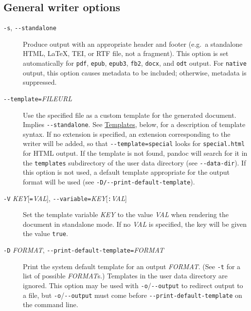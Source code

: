 \documentclass[]{article}
\begin{document}
\hypertarget{general-writer-options}{%
\subsection{General writer options}\label{general-writer-options}}

\begin{description}
\item[\texttt{-s}, \texttt{-\/-standalone}]
Produce output with an appropriate header and footer (e.g.~a standalone
HTML, LaTeX, TEI, or RTF file, not a fragment). This option is set
automatically for \texttt{pdf}, \texttt{epub}, \texttt{epub3},
\texttt{fb2}, \texttt{docx}, and \texttt{odt} output. For
\texttt{native} output, this option causes metadata to be included;
otherwise, metadata is suppressed.
\item[\texttt{-\/-template=}\emph{FILE}\textbar{}\emph{URL}]
Use the specified file as a custom template for the generated document.
Implies \texttt{-\/-standalone}. See
\protect\hyperlink{templates}{Templates}, below, for a description of
template syntax. If no extension is specified, an extension
corresponding to the writer will be added, so that
\texttt{-\/-template=special} looks for \texttt{special.html} for HTML
output. If the template is not found, pandoc will search for it in the
\texttt{templates} subdirectory of the user data directory (see
\texttt{-\/-data-dir}). If this option is not used, a default template
appropriate for the output format will be used (see
\texttt{-D/-\/-print-default-template}).
\item[\texttt{-V} \emph{KEY}{[}\texttt{=}\emph{VAL}{]},
\texttt{-\/-variable=}\emph{KEY}{[}\texttt{:}\emph{VAL}{]}]
Set the template variable \emph{KEY} to the value \emph{VAL} when
rendering the document in standalone mode. If no \emph{VAL} is
specified, the key will be given the value \texttt{true}.
\item[\texttt{-D} \emph{FORMAT},
\texttt{-\/-print-default-template=}\emph{FORMAT}]
Print the system default template for an output \emph{FORMAT}. (See
\texttt{-t} for a list of possible \emph{FORMAT}s.) Templates in the
user data directory are ignored. This option may be used with
\texttt{-o}/\texttt{-\/-output} to redirect output to a file, but
\texttt{-o}/\texttt{-\/-output} must come before
\texttt{-\/-print-default-template} on the command line.


\end{description}
\end{document}
